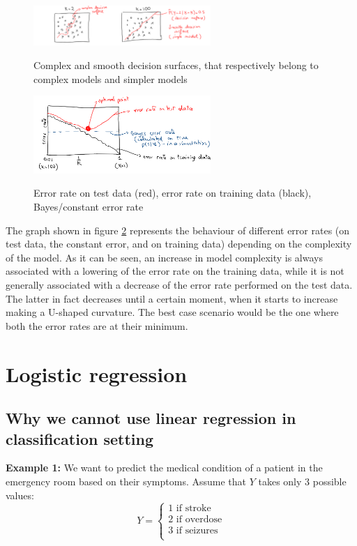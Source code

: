 \begin{figure}[h]
\caption{Complex and smooth decision surfaces, that respectively belong to complex models and simpler models}
\centering
\includegraphics[width=0.6\textwidth]{KneighbourDecisionSurf}
\label{}
\end{figure}

\begin{figure}[h]
\caption{Error rate on test data (red), error rate on training data (black), Bayes/constant error rate}
\centering
\includegraphics[width=0.6\textwidth]{KneighbourSimpleAgainstComplex}
\label{errorRate}
\end{figure}

The graph shown in figure \ref{errorRate} represents the behaviour of different error rates (on test data, the constant error, and on training data) depending on the complexity of the model. As it can be seen, an increase in model complexity is always associated with a lowering of the error rate on the training data, while it is not generally associated with a decrease of the error rate performed on the test data. The latter in fact decreases until a certain moment, when it starts to increase making a U-shaped curvature. The best case scenario would be the one where both the error rates are at their minimum.

  \section{Logistic regression}
    \subsection{Why we cannot use linear regression in classification setting}
    \textbf{Example 1:} We want to predict the medical condition of a patient in the emergency room based on their symptoms. Assume that $Y$ takes only 3 possible values:
    $$
    Y = \begin{cases}
          1 \text{ if stroke} \\
	      2 \text{ if overdose} \\
	      3 \text{ if seizures} \\
        \end{cases}
    $$

